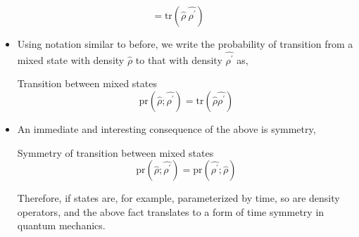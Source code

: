 \documentclass[9pt,handout]{beamer}
\newcommand{\pr}[0]{\text{pr}}
\newcommand{\tr}[0]{\text{tr}}
\begin{document}
\begin{frame}{}
$$ = \tr \left( \widehat{\rho} \: \widehat{\rho^\prime} \right)$$

\begin{itemize}
\item Using notation similar to before, we write the probability of transition from a mixed state with density $\widehat{\rho}$ to that with density $\widehat{\rho^\prime}$ as,

\begin{block}{Transition between mixed states}
$$\pr \left( \widehat{\rho}; \widehat{\rho^\prime} \right) = \tr \left( \widehat{\rho} \widehat{\rho^\prime} \right)$$
\end{block}

\item An immediate and interesting consequence of the above is symmetry,

\begin{block}{Symmetry of transition between mixed states}
$$\pr \left( \widehat{\rho}; \widehat{\rho^\prime} \right) = \pr \left( \widehat{\rho^\prime}; \widehat{\rho} \right)$$
\end{block}

Therefore, if states are, for example, parameterized by time, so are density operators, and the above fact translates to a form of time symmetry in quantum mechanics.
\end{itemize}
\end{frame}
\end{document}
